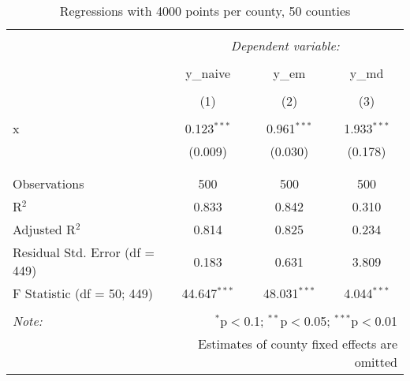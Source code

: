 
\begin{table}[!htbp] \centering 
  \caption{Regressions with 4000 points per county, 50 counties} 
  \label{} 
\begin{tabular}{@{\extracolsep{5pt}}lccc} 
\\[-1.8ex]\hline 
\hline \\[-1.8ex] 
 & \multicolumn{3}{c}{\textit{Dependent variable:}} \\ 
\cline{2-4} 
\\[-1.8ex] & y\_naive & y\_em & y\_md \\ 
\\[-1.8ex] & (1) & (2) & (3)\\ 
\hline \\[-1.8ex] 
 x & 0.123$^{***}$ & 0.961$^{***}$ & 1.933$^{***}$ \\ 
  & (0.009) & (0.030) & (0.178) \\ 
  & & & \\ 
\hline \\[-1.8ex] 
Observations & 500 & 500 & 500 \\ 
R$^{2}$ & 0.833 & 0.842 & 0.310 \\ 
Adjusted R$^{2}$ & 0.814 & 0.825 & 0.234 \\ 
Residual Std. Error (df = 449) & 0.183 & 0.631 & 3.809 \\ 
F Statistic (df = 50; 449) & 44.647$^{***}$ & 48.031$^{***}$ & 4.044$^{***}$ \\ 
\hline 
\hline \\[-1.8ex] 
\textit{Note:}  & \multicolumn{3}{r}{$^{*}$p$<$0.1; $^{**}$p$<$0.05; $^{***}$p$<$0.01} \\ 
 & \multicolumn{3}{r}{Estimates of county fixed effects are omitted} \\ 
\end{tabular} 
\end{table} 
